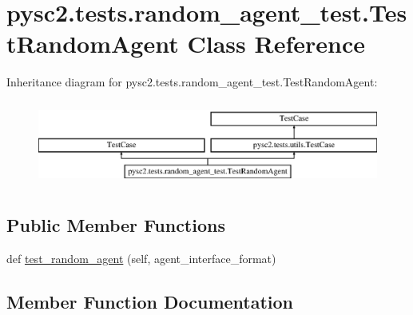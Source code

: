 \hypertarget{classpysc2_1_1tests_1_1random__agent__test_1_1_test_random_agent}{}\section{pysc2.\+tests.\+random\+\_\+agent\+\_\+test.\+Test\+Random\+Agent Class Reference}
\label{classpysc2_1_1tests_1_1random__agent__test_1_1_test_random_agent}
Inheritance diagram for pysc2.\+tests.\+random\+\_\+agent\+\_\+test.\+Test\+Random\+Agent\+:\begin{figure}[H]
\begin{center}
\leavevmode
\includegraphics[height=2.818792cm]{classpysc2_1_1tests_1_1random__agent__test_1_1_test_random_agent}
\end{center}
\end{figure}
\subsection*{Public Member Functions}
\begin{DoxyCompactItemize}
\item 
def \mbox{\hyperlink{classpysc2_1_1tests_1_1random__agent__test_1_1_test_random_agent_a1423d35d427938157aee716940a5a2c2}{test\+\_\+random\+\_\+agent}} (self, agent\+\_\+interface\+\_\+format)
\end{DoxyCompactItemize}


\subsection{Member Function Documentation}
\mbox{\label{classpysc2_1_1tests_1_1random__agent__test_1_1_test_random_agent_a1423d35d427938157aee716940a5a2c2}} 
